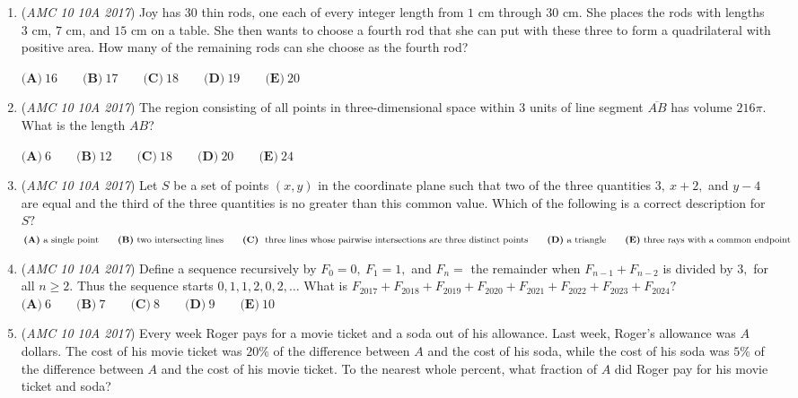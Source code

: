 \begin{enumerate}
 $\textbf{(A)}\ 45\qquad\textbf{(B)}\ 60\qquad\textbf{(C)}\ 65\qquad\textbf{(D)}\ 90\qquad\textbf{(E)}\ 95$


	\item (\textit{AMC 10 10A 2017}) Joy has $30$ thin rods, one each of every integer length from $1$ cm through $30$ cm. She places the rods with lengths $3$ cm, $7$ cm, and $15$ cm on a table. She then wants to choose a fourth rod that she can put with these three to form a quadrilateral with positive area. How many of the remaining rods can she choose as the fourth rod?


 $\textbf{(A)}\ 16\qquad\textbf{(B)}\ 17\qquad\textbf{(C)}\ 18\qquad\textbf{(D)}\ 19\qquad\textbf{(E)}\ 20$


	\item (\textit{AMC 10 10A 2017}) The region consisting of all points in three-dimensional space within $3$ units of line segment $\overline{AB}$ has volume $216\pi$. What is the length $\textit{AB}$?


 $\textbf{(A)}\ 6\qquad\textbf{(B)}\ 12\qquad\textbf{(C)}\ 18\qquad\textbf{(D)}\ 20\qquad\textbf{(E)}\ 24$


	\item (\textit{AMC 10 10A 2017}) Let $S$ be a set of points $(x,y)$ in the coordinate plane such that two of the three quantities $3,~x+2,$ and $y-4$ are equal and the third of the three quantities is no greater than this common value. Which of the following is a correct description for $S?$
$\textbf{(A)}\ \text{a single point} \qquad\textbf{(B)}\ \text{two intersecting lines} \\\qquad\textbf{(C)}\ \text{ three lines whose pairwise intersections are three distinct points} \\\qquad\textbf{(D)}\ \text{a triangle} \qquad\textbf{(E)}\ \text{three rays with a common endpoint}$


	\item (\textit{AMC 10 10A 2017}) Define a sequence recursively by $F_{0}=0,~F_{1}=1,$ and $F_{n}=$ the remainder when $F_{n-1}+F_{n-2}$ is divided by $3,$ for all $n\geq 2.$ Thus the sequence starts $0,1,1,2,0,2,\ldots$ What is $F_{2017}+F_{2018}+F_{2019}+F_{2020}+F_{2021}+F_{2022}+F_{2023}+F_{2024}?$
$\textbf{(A)}\ 6\qquad\textbf{(B)}\ 7\qquad\textbf{(C)}\ 8\qquad\textbf{(D)}\ 9\qquad\textbf{(E)}\ 10$


	\item (\textit{AMC 10 10A 2017}) Every week Roger pays for a movie ticket and a soda out of his allowance. Last week, Roger's allowance was $A$ dollars. The cost of his movie ticket was $20\%$ of the difference between $A$ and the cost of his soda, while the cost of his soda was $5\%$ of the difference between $A$ and the cost of his movie ticket. To the nearest whole percent, what fraction of $A$ did Roger pay for his movie ticket and soda?



\end{enumerate}

